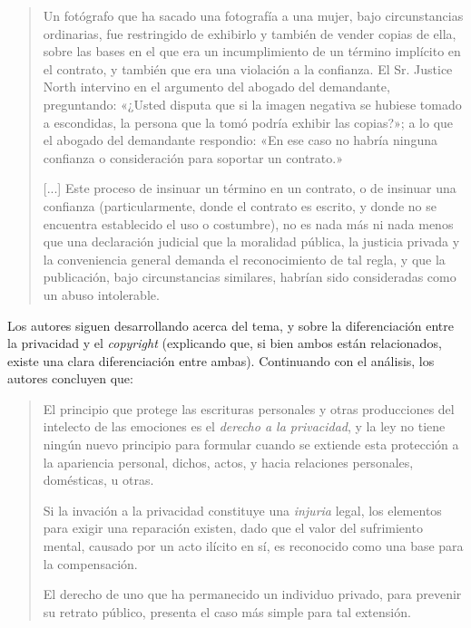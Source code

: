 \documentclass[12pt,a4paper,twoside]{book}
\begin{document}
\begin{quotation}
Un fotógrafo que ha sacado una fotografía a una mujer, bajo circunstancias ordinarias, fue restringido de exhibirlo y también de vender copias de ella, sobre las bases en el que era un incumplimiento de un término implícito en el contrato, y también que era una violación a la confianza. El Sr. Justice North intervino en el argumento del abogado del demandante, preguntando: «¿Usted disputa que si la imagen negativa se hubiese tomado a escondidas, la persona que la tomó podría exhibir las copias?»; a lo que el abogado del demandante respondio: «En ese caso no habría ninguna confianza o consideración para soportar un contrato.»

[...] Este proceso de insinuar un término en un contrato, o de insinuar una confianza (particularmente, donde el contrato es escrito, y donde no se encuentra establecido el uso o costumbre), no es nada más ni nada menos que una declaración judicial que la moralidad pública, la justicia privada y la conveniencia general demanda el reconocimiento de tal regla, y que la publicación, bajo circunstancias similares, habrían sido consideradas como un abuso intolerable. \cite[págs. 208, 210]{derecho-privacidad}
\end{quotation}

Los autores siguen desarrollando acerca del tema, y sobre la diferenciación entre la privacidad y el \textit{copyright} (explicando que, si bien ambos están relacionados, existe una clara diferenciación entre ambas). Continuando con el análisis, los autores concluyen que:

\begin{quotation}
El principio que protege las escrituras personales y otras producciones del intelecto de las emociones es el \textit{derecho a la privacidad}, y la ley no tiene ningún nuevo principio para formular cuando se extiende esta protección a la apariencia personal, dichos, actos, y hacia relaciones personales, domésticas, u otras. 

Si la invación a la privacidad constituye una \textit{injuria} legal, los elementos para exigir una reparación existen, dado que el valor del sufrimiento mental, causado por un acto ilícito en sí, es reconocido como una base para la compensación.

El derecho de uno que ha permanecido un individuo privado, para prevenir su retrato público, presenta el caso más simple para tal extensión. \cite[pág. 213]{derecho-privacidad}
\end{quotation}
\end{document}
